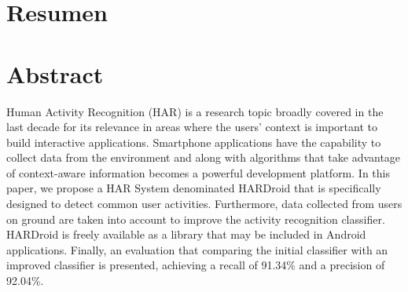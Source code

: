 
\chapter*{Resumen}

\blankpagelegend

\chapter*{Abstract}
Human Activity Recognition (HAR) is a research topic broadly covered in the last decade for its relevance in areas where the users’ context is important to build interactive applications. Smartphone applications have the capability to collect data from the environment and along with algorithms that take advantage of context-aware information becomes a powerful development platform. In this paper, we propose a HAR System denominated HARDroid that is specifically designed to detect common user activities. Furthermore, data collected from users on ground are taken into account to improve the activity recognition classifier. HARDroid is freely available as a library that may be included in Android applications. Finally, an evaluation that comparing the initial classifier with an improved classifier is presented, achieving a recall of 91.34\% and a precision of 92.04\%.

